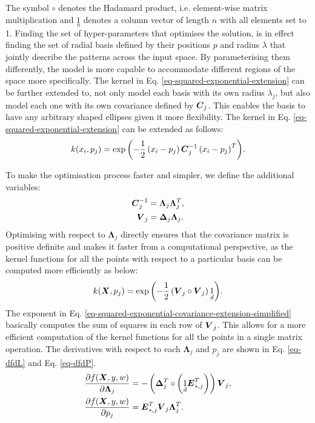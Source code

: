 \documentclass[useAMS,usenatbib,fleqn]{mn2e}
\begin{document}
The symbol $\circ$ denotes the Hadamard product, i.e. element-wise matrix multiplication and $\underset{n}{1}$ denotes a column vector of length $n$ with all elements set to 1. Finding the set of hyper-parameters that optimises the solution, is in effect finding the set of radial basis defined by their positions $p$ and radius $\lambda$ that jointly describe the patterns across the input space. By parameterising them differently, the model is more capable to accommodate different regions of the space more specifically. The kernel in Eq. \eqref{eq-squared-exponential-extension} can be further extended to, not only model each basis with its own radius $\lambda_{j}$, but also model each one with its own covariance defined by $\bmath{C}_{j}$. This enables the basis to have any arbitrary shaped ellipses given it more flexibility. The kernel in Eq. \eqref{eq-squared-exponential-extension} can be extended as follows:
\begin{equation}
\label{eq-squared-exponential-covariance-extension}
k(x_{i},p_{j}) = \exp{\left(-\frac{1}{2}\left(x_{i}-p_{j}\right)\bmath{C}_{j}^{-1}\left(x_{i}-p_{j}\right)^{T}\right)}.
\end{equation}

To make the optimisation process faster and simpler, we define the additional variables:
\begin{subequations}
\begin{align}
\label{eq-Cinv}
\bmath{C}_{j}^{-1} &= \mathbf\Lambda_{j}\mathbf\Lambda_{j}^{T},\\
\label{eq-V_j}
\bmath{V}_{j} &= \mathbf\Delta_{j}\mathbf\Lambda_{j}.
\end{align}
\end{subequations}
Optimising with respect to $\mathbf\Lambda_{j}$ directly ensures that the covariance matrix is positive definite and makes it faster from a computational perspective, as the kernel functions for all the points with respect to a particular basis can be computed more efficiently as below:
\begin{equation}
\label{eq-squared-exponential-covariance-extension-simplified}
k(\bmath{X},p_{j}) = \exp{\left(-\frac{1}{2}\left(\bmath{V}_{j}\circ \bmath{V}_{j}\right)\underset{d}{1}\right)}.
\end{equation}
The exponent in Eq. \eqref{eq-squared-exponential-covariance-extension-simplified} basically computes the sum of squares in each row of $\bmath{V}_{j}$. This allows for a more efficient computation of the kernel functions for all the points in a single matrix operation. The derivatives with respect to each $\mathbf\Lambda_{j}$ and $p_{j}$ are shown in Eq. \eqref{eq-dfdL} and Eq. \eqref{eq-dfdP}.
\begin{subequations}
\begin{align}
\label{eq-dfdL}
\frac{\partial f(\bmath{X},y,w)}{\partial \mathbf\Lambda_{j}} &= -\left( \mathbf\Delta_{j}^{T}\circ \left(\underset{d}{1}\bmath{E}_{*,j}^{T}\right) \right)\bmath{V}_{j},\\
\label{eq-dfdP}
\frac{\partial f(\bmath{X},y,w)}{\partial p_{j}} &= \bmath{E}_{*,j}^{T}\bmath{V}_{j}\mathbf\Lambda_{j}^{T}.
\end{align}
\end{subequations}
\end{document}
